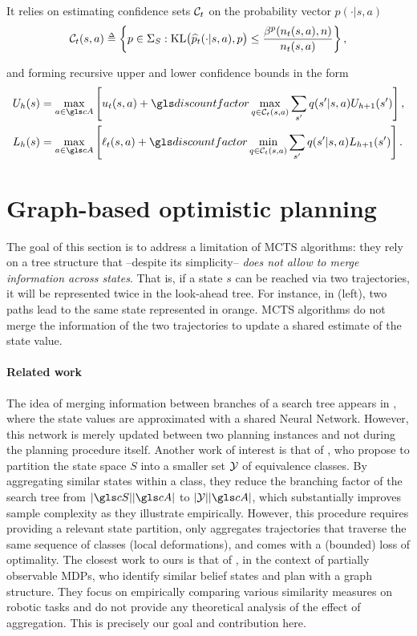 It relies on estimating confidence sets $\mathcal{C}_t$ on the probability vector $p(\cdot|s,a)$
$$\cC_t(s,a) \eqdef \left\{p\in \Sigma_S :  \KL\!\big(\hp_t(\cdot|s,a),p\big) \leq \frac {\beta^p(n_t(s,a), n)} {n_t(s,a)}\right\},$$

and forming recursive upper and lower confidence bounds in the form
\begin{align*}
U_{h}(s) &= \max_{a\in \cA} \left[u_t(s,a) + \discount \max_{q \in \cC_t(s,a)} \sum_{s'} q(s'|s,a) U_{h+1}(s')\right], \\
L_{h}(s) &= \max_{a\in \cA} \left[\ell_t(s,a) + \discount \min_{q \in \cC_t(s,a)} \sum_{s'} q(s'|s,a)L_{h+1}(s')\right].
\end{align*}

\section{Graph-based optimistic planning}
\label{sec:gbop}


The goal of this section is to address a limitation of \gls{MCTS} algorithms: they rely on a tree structure that  --despite its simplicity-- \emph{does not allow to merge information across states}. That is, if a state $s$ can be reached via two trajectories, it will be represented twice in the look-ahead tree. For instance, in  (left), two paths lead to the same state represented in orange. \gls{MCTS} algorithms do not merge the information of the two trajectories to update a shared estimate of the state value.

\paragraph{Related work}

The idea of merging information between branches of a search tree appears in \citep{Silver2018}, where the state values are approximated with a shared Neural Network. However, this network is merely updated between two planning instances and not during the planning procedure itself.
Another work of interest is that of \citet{Hostetler14}, who propose to partition the state space $S$ into a smaller set $\mathcal{Y}$ of equivalence classes. By aggregating similar states within a class, they reduce the branching factor of the search tree from $|\cS||\cA|$ to $|\cY||\cA|$, which substantially improves sample complexity as they illustrate empirically. However, this procedure requires providing a relevant state partition, only aggregates trajectories that traverse the same sequence of classes (\ie local deformations), and comes with a (bounded) loss of optimality.
The closest work to ours is that of \citet{Ballesteros2013}, in the context of partially observable \glspl{MDP}, who identify similar belief states and plan with a graph structure. They focus on empirically comparing various similarity measures on robotic tasks and do not provide any theoretical analysis of the effect of aggregation. This is precisely our goal and contribution here.

